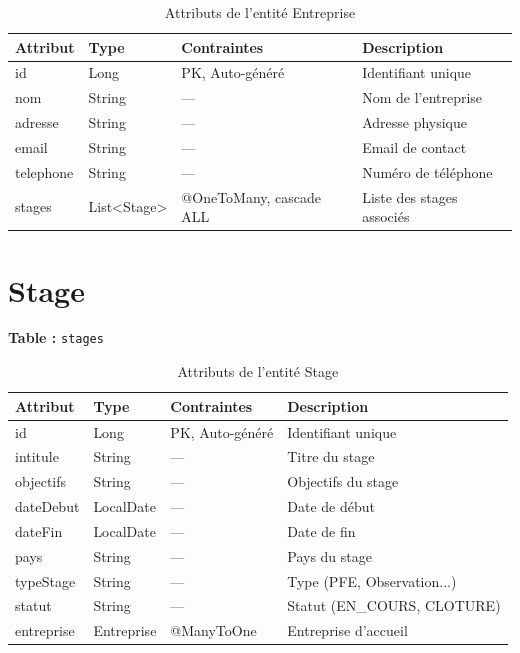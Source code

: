 \documentclass[12pt,a4paper]{report}
\begin{document}
\begin{table}[H]
\centering
\begin{tabular}{|l|l|l|p{5cm}|}
\hline
\textbf{Attribut} & \textbf{Type} & \textbf{Contraintes} & \textbf{Description} \\ \hline
id & Long & PK, Auto-généré & Identifiant unique \\ \hline
nom & String & --- & Nom de l'entreprise \\ \hline
adresse & String & --- & Adresse physique \\ \hline
email & String & --- & Email de contact \\ \hline
telephone & String & --- & Numéro de téléphone \\ \hline
stages & List<Stage> & @OneToMany, cascade ALL & Liste des stages associés \\ \hline
\end{tabular}
\caption{Attributs de l'entité Entreprise}
\end{table}

\section{Stage}
\textbf{Table :} \texttt{stages}

\begin{table}[H]
\centering
\begin{tabular}{|l|l|l|p{5cm}|}
\hline
\textbf{Attribut} & \textbf{Type} & \textbf{Contraintes} & \textbf{Description} \\ \hline
id & Long & PK, Auto-généré & Identifiant unique \\ \hline
intitule & String & --- & Titre du stage \\ \hline
objectifs & String & --- & Objectifs du stage \\ \hline
dateDebut & LocalDate & --- & Date de début \\ \hline
dateFin & LocalDate & --- & Date de fin \\ \hline
pays & String & --- & Pays du stage \\ \hline
typeStage & String & --- & Type (PFE, Observation...) \\ \hline
statut & String & --- & Statut (EN\_COURS, CLOTURE) \\ \hline
entreprise & Entreprise & @ManyToOne & Entreprise d'accueil \\ \hline
\end{tabular}
\caption{Attributs de l'entité Stage}
\end{table}
\end{document}
